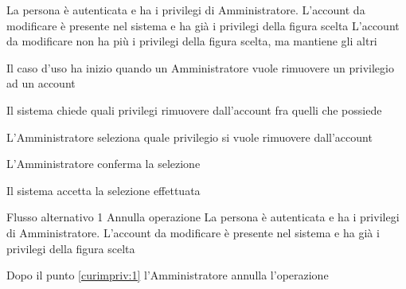 \tabcuvspace

{}
{La persona è autenticata e ha i privilegi di Amministratore. L'account da modificare è presente nel sistema e ha già i privilegi della figura scelta}
{L'account da modificare non ha più i privilegi della figura scelta, ma mantiene gli altri}
{\begin{enumCU}
	\item Il caso d'uso ha inizio quando un Amministratore vuole rimuovere un privilegio ad un account
	\item Il sistema chiede quali privilegi rimuovere dall'account  fra quelli che possiede
	\item L'Amministratore seleziona quale privilegio si vuole rimuovere dall'account \label{curimpriv:1}
	\item L'Amministratore conferma la selezione
	\item Il sistema accetta la selezione effettuata
\end{enumCU}}
%
{Flusso alternativo 1}%
{Annulla operazione}%
{La persona è autenticata e ha i privilegi di Amministratore. L'account da modificare è presente nel sistema e ha già i privilegi della figura scelta}%
{\postNulle}%
{\begin{enumCU}
		\item Dopo il punto \ref{curimpriv:1} l'Amministratore annulla l'operazione
	\end{enumCU}}%


